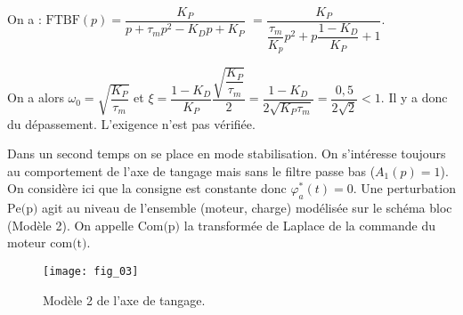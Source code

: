 \ifprof
\begin{corrige}
On a : $\text{FTBF}(p)=
\dfrac{K_P}{p+\tau_m p^2- K_Dp +K_P}$ 
$=\dfrac{K_P}{\dfrac{\tau_m}{K_p} p^2 + p\dfrac{1- K_D}{K_P} +1}$.

On a alors $\omega_0 = \sqrt{\dfrac{K_P}{\tau_m}}$ et $\xi = \dfrac{1- K_D}{K_P} \dfrac{\sqrt{\dfrac{K_P}{\tau_m}}}{2}= \dfrac{1- K_D}{2\sqrt{K_P \tau_m}}= \dfrac{0,5}{2\sqrt{2}} <1$. Il y a donc du dépassement. L'exigence n'est pas vérifiée. 
\end{corrige}
\else
\fi

\ifprof
\else

Dans un second temps on se place en mode stabilisation. On s’intéresse toujours au comportement de l’axe de
tangage mais sans le filtre passe bas ($A_1(p)=1$).
On considère ici que la consigne est constante donc $\varphi^*_a(t)=0$. Une perturbation $\text{Pe(p)}$ agit au niveau de l’ensemble (moteur, charge) modélisée sur le schéma bloc (Modèle 2). On appelle $\text{Com(p)}$ la transformée de Laplace de la commande du moteur $\text{com(t)}$.

\begin{figure}[H]
\texttt{[image: fig\_03]}

\caption{Modèle 2 de l’axe de tangage.}
\end{figure}
\fi

